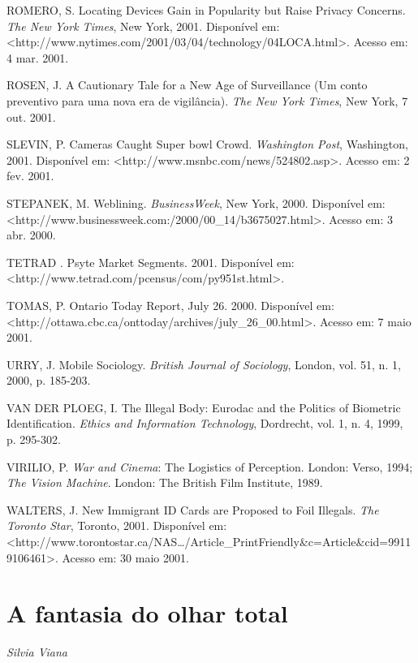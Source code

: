 ROMERO, S. Locating Devices Gain in Popularity but Raise Privacy
Concerns. \emph{The New York Times}, New York, 2001. Disponível em:
\textless{}http://www.nytimes.com/2001/03/04/technology/04LOCA.html\textgreater{}.
Acesso em: 4 mar. 2001.

ROSEN, J. A Cautionary Tale for a New Age of Surveillance (Um conto
preventivo para uma nova era de vigilância). \emph{The New York Times},
New York, 7 out. 2001.

SLEVIN, P. Cameras Caught Super bowl Crowd. \emph{Washington Post},
Washington, 2001. Disponível em:
\textless{}http://www.msnbc.com/news/524802.asp\textgreater{}. Acesso
em: 2 fev. 2001.

STEPANEK, M. Weblining. \emph{BusinessWeek}, New York, 2000. Disponível
em:
\textless{}http://www.businessweek.com:/2000/00\_14/b3675027.html\textgreater{}.
Acesso em: 3 abr. 2000.

TETRAD . Psyte Market Segments. 2001. Disponível em:
\textless{}http://www.tetrad.com/pcensus/com/py951st.html\textgreater{}.

TOMAS, P. Ontario Today Report, July 26. 2000. Disponível em:
\textless{}http://ottawa.cbc.ca/onttoday/archives/july\_26\_00.html\textgreater{}.
Acesso em: 7 maio 2001.

URRY, J. Mobile Sociology. \emph{British Journal of Sociology}, London,
vol. 51, n. 1, 2000, p. 185-203.

VAN DER PLOEG, I. The Illegal Body: Eurodac and the Politics of
Biometric Identification. \emph{Ethics and Information Technology},
Dordrecht, vol. 1, n. 4, 1999, p. 295-302.

VIRILIO, P. \emph{War and Cinema}: The Logistics of Perception. London:
Verso, 1994; \emph{The Vision Machine}. London: The British Film
Institute, 1989.

WALTERS, J. New Immigrant ID Cards are Proposed to Foil Illegals.
\emph{The Toronto Star}, Toronto, 2001. Disponível em:
\textless{}http://www.torontostar.ca/NAS\ldots{}/Article\_PrintFriendly\&c=Article\&cid=99119106461\textgreater{}.
Acesso em: 30 maio 2001.

\chapter{A fantasia do olhar
total}\label{a-fantasia-do-olhar-total}

\begin{flushright}
\emph{Silvia Viana}
\end{flushright}

